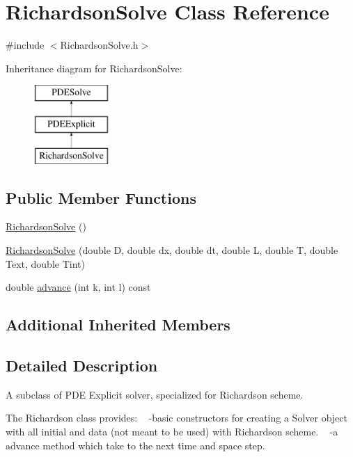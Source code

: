 \hypertarget{class_richardson_solve}{}\section{Richardson\+Solve Class Reference}
\label{class_richardson_solve}


{\ttfamily \#include $<$Richardson\+Solve.\+h$>$}

Inheritance diagram for Richardson\+Solve\+:\begin{figure}[H]
\begin{center}
\leavevmode
\includegraphics[height=3.000000cm]{class_richardson_solve}
\end{center}
\end{figure}
\subsection*{Public Member Functions}
\begin{DoxyCompactItemize}
\item 
\hyperlink{class_richardson_solve_a628a7f9104201f63094a49cb9d23b5ca}{Richardson\+Solve} ()
\item 
\hyperlink{class_richardson_solve_a181c71a169292bdba433af2564f763b5}{Richardson\+Solve} (double D, double dx, double dt, double L, double T, double Text, double Tint)
\item 
double \hyperlink{class_richardson_solve_adaedf7448ffb94b08690ce6e878ab33c}{advance} (int k, int l) const
\end{DoxyCompactItemize}
\subsection*{Additional Inherited Members}


\subsection{Detailed Description}
A subclass of P\+DE Explicit solver, specialized for Richardson scheme.

The Richardson class provides\+: ~\newline
-\/basic constructors for creating a Solver object with all initial  and data (not meant to be used)  with Richardson scheme. ~\newline
-\/a advance method which take to the next time and space step. 

